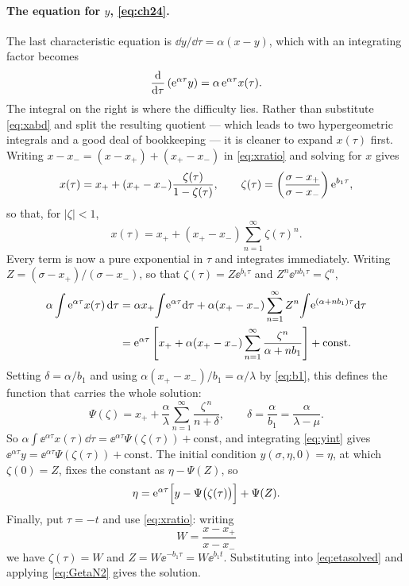 \paragraph{The equation for $y$, \eqref{eq:ch24}.}
The last characteristic equation is $\dd y/\dd\tau = \alpha(x-y)$, which with an
integrating factor becomes
\begin{equation}
\label{eq:yint}
\frac{\mathrm{d} }{\mathrm{d} \tau}\left(\mathrm{e}^{\alpha\tau}y\right) = \alpha\,\mathrm{e}^{\alpha\tau}x(\tau) .
\end{equation}
The integral on the right is where the difficulty lies. Rather than substitute
\cref{eq:xabd} and split the resulting quotient --- which leads to two
hypergeometric integrals and a good deal of bookkeeping --- it is cleaner to expand
$x(\tau)$ first. Writing $x-x_- = (x-x_+)+(x_+-x_-)$ in \cref{eq:xratio} and
solving for $x$ gives
\begin{equation}
\label{eq:xgeom}
x(\tau) = x_+ + (x_+-x_-)\frac{\zeta(\tau)}{1-\zeta(\tau)},
\qquad
\zeta(\tau) = \left(\frac{\sigma-x_+}{\sigma-x_-}\right)\mathrm{e}^{b_1\tau},
\end{equation}
so that, for $|\zeta|<1$,
\begin{equation*}
x(\tau) = x_+ + (x_+-x_-)\sum_{n=1}^{\infty}\zeta(\tau)^n .
\end{equation*}
Every term is now a pure exponential in $\tau$ and integrates immediately. Writing
$Z = (\sigma-x_+)/(\sigma-x_-)$, so that $\zeta(\tau) = Z\ee^{b_1\tau}$ and
$Z^n\ee^{nb_1\tau} = \zeta^n$,
\begin{align*}
\alpha\int\mathrm{e}^{\alpha\tau}x(\tau)\,\mathrm{d}\tau
&= \alpha x_+\!\int\!\mathrm{e}^{\alpha\tau}\mathrm{d}\tau
 + \alpha(x_+-x_-)\sum_{n=1}^{\infty}Z^n\!\int\!\mathrm{e}^{(\alpha+nb_1)\tau}\mathrm{d}\tau\\
&= \mathrm{e}^{\alpha\tau}\left[x_+ + \alpha(x_+-x_-)\sum_{n=1}^{\infty}\frac{\zeta^n}{\alpha+nb_1}\right]
 + \text{const} .
\end{align*}
Setting $\delta = \alpha/b_1$ and using $\alpha(x_+-x_-)/b_1 = \alpha/\lambda$ by
\cref{eq:b1}, this defines the function that carries the whole solution:
\begin{equation}
\label{eq:Psidef}
\Psi(\zeta) = x_+ + \frac{\alpha}{\lambda}\sum_{n=1}^{\infty}\frac{\zeta^{\,n}}{n+\delta},
\qquad
\delta = \frac{\alpha}{b_1} = \frac{\alpha}{\lambda-\mu} .
\end{equation}
So $\alpha\int\ee^{\alpha\tau}x(\tau)\dd\tau = \ee^{\alpha\tau}\Psi(\zeta(\tau)) + \text{const}$,
and integrating \cref{eq:yint} gives
$\ee^{\alpha\tau}y = \ee^{\alpha\tau}\Psi(\zeta(\tau)) + \text{const}$. The initial
condition $y(\sigma,\eta,0)=\eta$, at which $\zeta(0)=Z$, fixes the constant as
$\eta-\Psi(Z)$, so
\begin{equation}
\label{eq:etasolved}
\eta = \mathrm{e}^{\alpha\tau}\Bigl[y-\Psi\bigl(\zeta(\tau)\bigr)\Bigr] + \Psi(Z) .
\end{equation}
Finally, put $\tau=-t$ and use \cref{eq:xratio}: writing
\begin{equation*}
W = \frac{x-x_+}{x-x_-}
\end{equation*}
we have $\zeta(\tau) = W$ and $Z = W\ee^{-b_1\tau} = W\ee^{b_1t}$. Substituting into
\cref{eq:etasolved} and applying \cref{eq:GetaN2} gives the solution.

